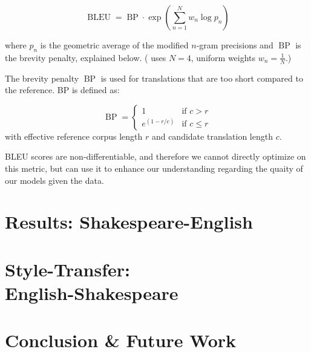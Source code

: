 \documentclass[twoside,twocolumn]{article}
\begin{document}
\begin{equation}
  \operatorname{BLEU} = \operatorname{BP} \cdot \exp \left( \sum_{n=1}^N w_n \log p_n \right)
\end{equation}

\noindent
where $p_n$ is the geometric average of the modified $n$-gram precisions
and $\operatorname{BP}$ is the brevity penalty, explained below.
(\cite{papineni2002bleu} uses $N=4$, uniform weights $w_n = \frac{1}{N}$.)

The brevity penalty $\operatorname{BP}$ is used for translations that are
too short compared to the reference. BP is defined as:

\begin{equation}
  \operatorname{BP} = \begin{cases}
    1 & \text{if } c > r \\
    e^{(1-r/c)} & \text{if } c \leq r
  \end{cases}
\end{equation}
\noindent
with effective reference corpus length $r$ and candidate translation length $c$.

BLEU scores are non-differentiable, and therefore we cannot directly optimize
on this metric, but can use it to enhance our understanding regarding the
quaity of our models given the data.

\section{Results: Shakespeare-English}
\label{sec:results}
\section{Style-Transfer:\\English-Shakespeare}
\label{sec:style-transfer}
\section{Conclusion \& Future Work}
\label{sec:conclusion}








\end{document}
